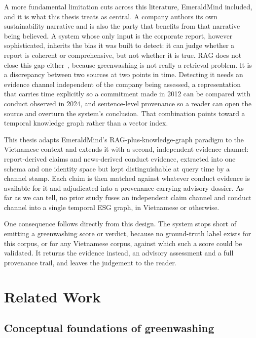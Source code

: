 \documentclass[fontsize=12pt,oneside,headings=small]{scrreprt}
\begin{document}
A more fundamental limitation cuts across this literature, EmeraldMind included, and it is what this thesis treats as central. A company authors its own sustainability narrative and is also the party that benefits from that narrative being believed. A system whose only input is the corporate report, however sophisticated, inherits the bias it was built to detect: it can judge whether a report is coherent or comprehensive, but not whether it is true. RAG does not close this gap either~\cite{lewis2020retrieval}, because greenwashing is not really a retrieval problem. It is a discrepancy between two sources at two points in time. Detecting it needs an evidence channel independent of the company being assessed, a representation that carries time explicitly so a commitment made in 2012 can be compared with conduct observed in 2024, and sentence-level provenance so a reader can open the source and overturn the system's conclusion. That combination points toward a temporal knowledge graph rather than a vector index.

This thesis adapts EmeraldMind's RAG-plus-knowledge-graph paradigm to the Vietnamese context and extends it with a second, independent evidence channel: report-derived claims and news-derived conduct evidence, extracted into one schema and one identity space but kept distinguishable at query time by a channel stamp. Each claim is then matched against whatever conduct evidence is available for it and adjudicated into a provenance-carrying advisory dossier. As far as we can tell, no prior study fuses an independent claim channel and conduct channel into a single temporal ESG graph, in Vietnamese or otherwise.

One consequence follows directly from this design. The system stops short of emitting a greenwashing score or verdict, because no ground-truth label exists for this corpus, or for any Vietnamese corpus, against which such a score could be validated. It returns the evidence instead, an advisory assessment and a full provenance trail, and leaves the judgement to the reader.
\section{Related Work}

\subsection{Conceptual foundations of greenwashing}
\end{document}
